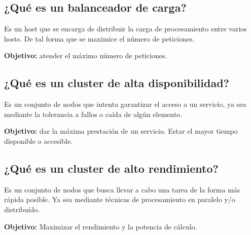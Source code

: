 \documentclass[11pt]{article}
\begin{document}
\subsection{¿Qué es un balanceador de carga?}
\label{sec:org3d6df63}
Es un host que se encarga de distribuir la carga de procesamiento entre varios hosts. De tal forma que se maximice el número de peticiones.

\textbf{Objetivo:} atender el máximo número de peticiones.
\subsection{¿Qué es un cluster de alta disponibilidad?}
\label{sec:orgcff7681}
Es un conjunto de nodos que intenta garantizar el acceso a un servicio, ya sea mediante la tolerancia a fallos o caída de algún elemento.

\textbf{Objetivo:} dar la máxima prestación de un servicio. Estar el mayor tiempo disponible o accesible.
\subsection{¿Qué es un cluster de alto rendimiento?}
\label{sec:org97eda66}
Es un conjunto de nodos que busca llevar a cabo una tarea de la forma más rápida posible. Ya sea mediante técnicas de procesamiento en paralelo y/o distribuído.

\textbf{Objetivo:} Maximizar el rendimiento y la potencia de cálculo.
\end{document}
